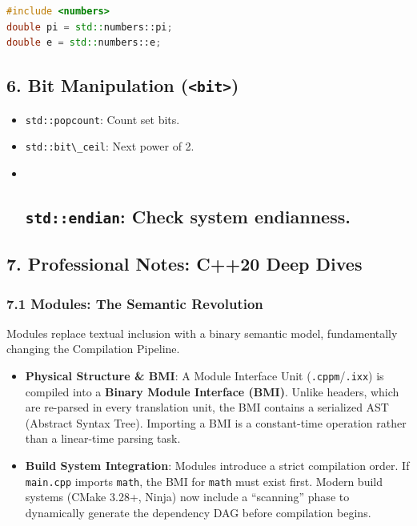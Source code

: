 \begin{lstlisting}[language={C++}]
#include <numbers>
double pi = std::numbers::pi;
double e = std::numbers::e;
\end{lstlisting}

\hypertarget{bit-manipulation-bit}{%
\subsection{\texorpdfstring{6. Bit Manipulation
(\texttt{\textless{}bit\textgreater{}})}{6. Bit Manipulation (\textless bit\textgreater)}}\label{bit-manipulation-bit}}

\begin{itemize}
\item
  \passthrough{\lstinline!std::popcount!}: Count set bits.
\item
  \passthrough{\lstinline!std::bit\_ceil!}: Next power of 2.
\item ~
  \hypertarget{stdendian-check-system-endianness.}{%
  \subsection{\texorpdfstring{\texttt{std::endian}: Check system
  endianness.}{std::endian: Check system endianness.}}\label{stdendian-check-system-endianness.}}
\end{itemize}

\hypertarget{professional-notes-c20-deep-dives}{%
\subsection{7. Professional Notes: C++20 Deep
Dives}\label{professional-notes-c20-deep-dives}}

\hypertarget{modules-the-semantic-revolution}{%
\subsubsection{7.1 Modules: The Semantic
Revolution}\label{modules-the-semantic-revolution}}

Modules replace textual inclusion with a binary semantic model,
fundamentally changing the Compilation Pipeline.

\begin{itemize}
\tightlist
\item
  \textbf{Physical Structure \& BMI}: A Module Interface Unit
  (\passthrough{\lstinline!.cppm!}/\passthrough{\lstinline!.ixx!}) is
  compiled into a \textbf{Binary Module Interface (BMI)}. Unlike
  headers, which are re-parsed in every translation unit, the BMI
  contains a serialized AST (Abstract Syntax Tree). Importing a BMI is a
  constant-time operation rather than a linear-time parsing task.
\item
  \textbf{Build System Integration}: Modules introduce a strict
  compilation order. If \passthrough{\lstinline!main.cpp!} imports
  \passthrough{\lstinline!math!}, the BMI for
  \passthrough{\lstinline!math!} must exist first. Modern build systems
  (CMake 3.28+, Ninja) now include a ``scanning'' phase to dynamically
  generate the dependency DAG before compilation begins.
\end{itemize}

